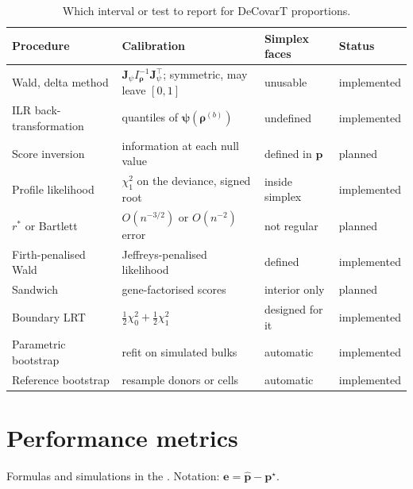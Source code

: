 \begin{table}[ht]
  \centering
  \small
  \caption{Which interval or test to report for DeCovarT proportions.}
  \label{tab:inference-recap}
  \begin{tabular}{@{}>{\raggedright\arraybackslash}p{}>{\raggedright\arraybackslash}p{}>{\raggedright\arraybackslash}p{}>{\raggedright\arraybackslash}p{}@{}}
    \toprule
    Procedure & Calibration & Simplex faces & Status \\
    \midrule
    Wald, delta method & \(\mathbf{J}_{\psi}I_{\boldsymbol{\rho}}^{-1}\mathbf{J}_{\psi}^{\top}\); symmetric, may leave \([0,1]\) & unusable & implemented \\
    ILR back-transformation & quantiles of \(\boldsymbol{\psi}(\boldsymbol{\rho}^{(b)})\) & undefined & implemented \\
    Score inversion & information at each null value & defined in \(\boldsymbol{p}\) & planned \\
    Profile likelihood & \(\chi^{2}_{1}\) on the deviance, signed root & inside simplex & implemented \\
    \(r^{\ast}\) or Bartlett & \(O(n^{-3/2})\) or \(O(n^{-2})\) error & not regular & planned \\
    Firth-penalised Wald & Jeffreys-penalised likelihood & defined & implemented \\
    Sandwich & gene-factorised scores & interior only & planned \\
    Boundary LRT & \(\tfrac12\chi^{2}_{0}+\tfrac12\chi^{2}_{1}\) & designed for it & implemented \\
    Parametric bootstrap & refit on simulated bulks & automatic & implemented \\
    Reference bootstrap & resample donors or cells & automatic & implemented \\
    \bottomrule
  \end{tabular}
\end{table}

\section{Performance metrics}
\label{app:metrics}

Formulas and simulations in the
.
Notation: \(\boldsymbol{e}=\hat{\boldsymbol{p}}-\boldsymbol{p}^{\star}\).


